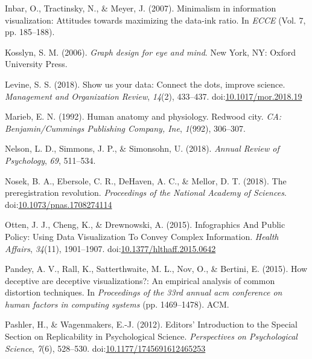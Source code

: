 \documentclass[
  doc]{apa6}
\begin{document}
\leavevmode\hypertarget{ref-inbar2007minimalism}{}%
Inbar, O., Tractinsky, N., \& Meyer, J. (2007). Minimalism in information visualization: Attitudes towards maximizing the data-ink ratio. In \emph{ECCE} (Vol. 7, pp. 185--188).

\leavevmode\hypertarget{ref-Kosslyn2006e}{}%
Kosslyn, S. M. (2006). \emph{Graph design for eye and mind}. New York, NY: Oxford University Press.

\leavevmode\hypertarget{ref-Levine2018}{}%
Levine, S. S. (2018). Show us your data: Connect the dots, improve science. \emph{Management and Organization Review}, \emph{14}(2), 433--437. doi:\href{https://doi.org/10.1017/mor.2018.19}{10.1017/mor.2018.19}

\leavevmode\hypertarget{ref-marieb1992human}{}%
Marieb, E. N. (1992). Human anatomy and physiology. Redwood city. \emph{CA: Benjamin/Cummings Publishing Company, Ine}, \emph{1}(992), 306--307.

\leavevmode\hypertarget{ref-Nelson2018a}{}%
Nelson, L. D., Simmons, J. P., \& Simonsohn, U. (2018). \emph{Annual Review of Psychology}, \emph{69}, 511--534.

\leavevmode\hypertarget{ref-Nosek2018}{}%
Nosek, B. A., Ebersole, C. R., DeHaven, A. C., \& Mellor, D. T. (2018). The preregistration revolution. \emph{Proceedings of the National Academy of Sciences}. doi:\href{https://doi.org/10.1073/pnas.1708274114}{10.1073/pnas.1708274114}

\leavevmode\hypertarget{ref-Otten2015}{}%
Otten, J. J., Cheng, K., \& Drewnowski, A. (2015). Infographics And Public Policy: Using Data Visualization To Convey Complex Information. \emph{Health Affairs}, \emph{34}(11), 1901--1907. doi:\href{https://doi.org/10.1377/hlthaff.2015.0642}{10.1377/hlthaff.2015.0642}

\leavevmode\hypertarget{ref-pandey2015deceptive}{}%
Pandey, A. V., Rall, K., Satterthwaite, M. L., Nov, O., \& Bertini, E. (2015). How deceptive are deceptive visualizations?: An empirical analysis of common distortion techniques. In \emph{Proceedings of the 33rd annual acm conference on human factors in computing systems} (pp. 1469--1478). ACM.

\leavevmode\hypertarget{ref-Pashler2012a}{}%
Pashler, H., \& Wagenmakers, E.-J. (2012). Editors' Introduction to the Special Section on Replicability in Psychological Science. \emph{Perspectives on Psychological Science}, \emph{7}(6), 528--530. doi:\href{https://doi.org/10.1177/1745691612465253}{10.1177/1745691612465253}
\end{document}
